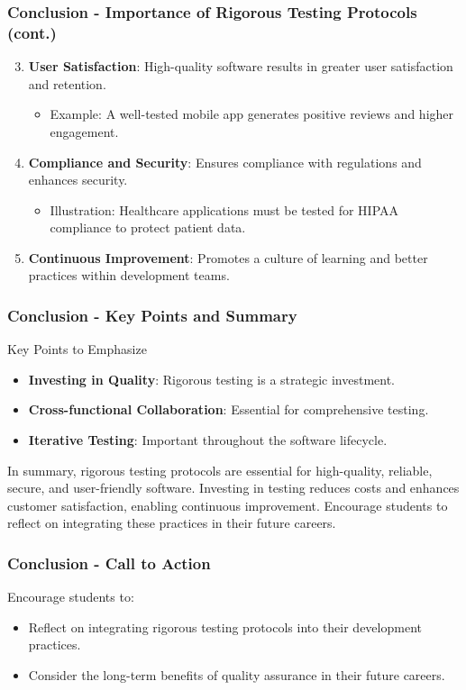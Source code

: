 \documentclass{beamer}
\begin{document}
\begin{frame}[fragile]
    \frametitle{Conclusion - Importance of Rigorous Testing Protocols (cont.)}
    \begin{enumerate}
        \setcounter{enumi}{2} %
        \item \textbf{User Satisfaction}:
        High-quality software results in greater user satisfaction and retention.
        \begin{itemize}
            \item Example: A well-tested mobile app generates positive reviews and higher engagement.
        \end{itemize}

        \item \textbf{Compliance and Security}:
        Ensures compliance with regulations and enhances security.
        \begin{itemize}
            \item Illustration: Healthcare applications must be tested for HIPAA compliance to protect patient data.
        \end{itemize}

        \item \textbf{Continuous Improvement}:
        Promotes a culture of learning and better practices within development teams.
    \end{enumerate}
\end{frame}

\begin{frame}[fragile]
    \frametitle{Conclusion - Key Points and Summary}
    \begin{block}{Key Points to Emphasize}
        \begin{itemize}
            \item \textbf{Investing in Quality}: Rigorous testing is a strategic investment.
            \item \textbf{Cross-functional Collaboration}: Essential for comprehensive testing.
            \item \textbf{Iterative Testing}: Important throughout the software lifecycle.
        \end{itemize}
    \end{block}

    In summary, rigorous testing protocols are essential for high-quality, reliable, secure, and user-friendly software. Investing in testing reduces costs and enhances customer satisfaction, enabling continuous improvement. Encourage students to reflect on integrating these practices in their future careers.
\end{frame}

\begin{frame}[fragile]
    \frametitle{Conclusion - Call to Action}
    Encourage students to:
    \begin{itemize}
        \item Reflect on integrating rigorous testing protocols into their development practices.
        \item Consider the long-term benefits of quality assurance in their future careers.
    \end{itemize}
\end{frame}
\end{document}
